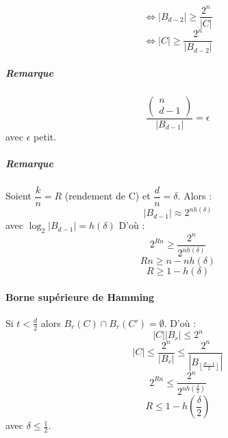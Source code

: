 \documentclass[12pt,a4paper]{report}
\begin{document}
$$ \Longleftrightarrow |B_{d-2}| \geqslant \frac{2^n}{|C|} $$
$$ \Longleftrightarrow |C| \geqslant \frac{2^n}{|B_{d-2}|} $$
\subparagraph{Remarque\\}
$$ \frac{\left(\begin{array}{c} n \\ d-1 \end{array}\right)}{|B_{d-1}|} = \epsilon $$
avec $\epsilon$ petit.
\subparagraph{Remarque\\}
Soient $\dfrac{k}{n} = R$ (rendement de C) et $\dfrac{d}{n}=\delta $. Alors :
$$ |B_{d-1}| \approx 2^{nh(\delta)} $$
avec $ \log_2 |B_{d-1}| = h(\delta) $
D'où :
$$ 2^{Rn} \geqslant \frac{2^n}{2^{nh(\delta)}} $$
$$ Rn \geqslant n-nh(\delta) $$
$$ R \geqslant 1-h(\delta) $$
\paragraph{Borne supérieure de Hamming\\}
Si $t<\frac{d}{2}$ alors $B_r(C) \cap B_r(C') = \emptyset $. D'où :
$$ |C||B_r| \leqslant 2^n $$
$$ |C| \leqslant \frac{2^n}{|B_r|} \leqslant \frac{2^n}{|B_{\left\lfloor\frac{d-1}{2}\right\rfloor}|} $$
$$ 2^{Rn} \leqslant \frac{2^n}{2^{nh(\frac{\delta}{2})}} $$
$$ R \leqslant 1 - h\left(\frac{\delta}{2}\right)$$
avec $\delta \leqslant \frac{1}{2} $.
\end{document}
